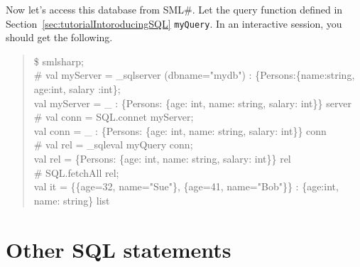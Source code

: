 \documentclass{jbook}
\newcommand{\txt}[2]{#2}
\newcommand{\smlsharp}{SML\#}
\newenvironment{program}{\begin{tt}\begin{quote}}{\end{quote}\end{tt}}
\begin{document}
	Now let's access this database from \smlsharp{}.
	Let the query function defined in Section~\ref{sec:tutorialIntoroducingSQL}
{\tt myQuery}.
	In an interactive session, you should get the following.
\begin{program}
\$ smlsharp;\\
\# val myServer = \_sqlserver (dbname="mydb") : \{Persons:\{name:string, age:int, salary :int\};\\
val myServer = \_ : \{Persons: \{age: int, name: string, salary: int\}\} server\\
\# val conn = SQL.connet myServer;\\
val conn = \_ : \{Persons: \{age: int, name: string, salary: int\}\} conn\\
\# val rel = \_sqleval myQuery conn;\\
val rel = \{Persons: \{age: int, name: string, salary: int\}\} rel\\
\# SQL.fetchAll rel;\\
val it = \{\{age=32, name="Sue"\}, \{age=41, name="Bob"\}\} : \{age:int, name: string\} list
\end{program}
\fi%

\section{\txt{その他のSQL文}{Other SQL statements}}
\label{sec:tutorialOtherSQLElement}
\end{document}
